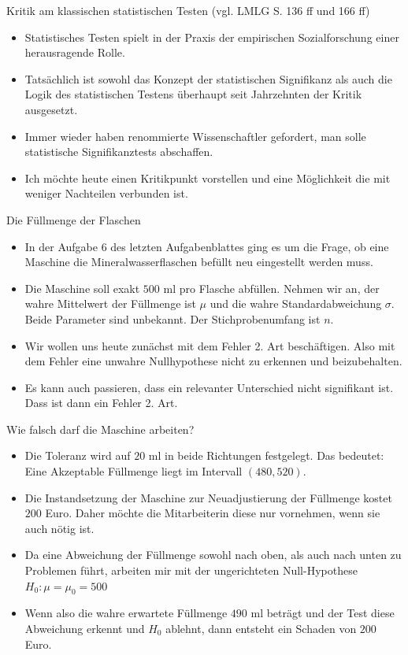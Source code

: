 \documentclass[usenames,dvipsnames,handout]{beamer}
\begin{document}
\begin{frame}{Kritik am klassischen statistischen Testen }
(vgl. LMLG S. 136 ff und 166 ff)
\begin{itemize}
\item{Statistisches Testen spielt in der Praxis der empirischen Sozialforschung einer herausragende Rolle.}\pause
\item{Tatsächlich ist sowohl das Konzept der statistischen Signifikanz als auch die Logik des statistischen
Testens überhaupt seit Jahrzehnten der Kritik ausgesetzt.}\pause
\item{Immer wieder haben renommierte Wissenschaftler gefordert, man solle statistische Signifikanztests
abschaffen. }\pause
\item{Ich möchte heute einen Kritikpunkt vorstellen und eine Möglichkeit die mit weniger Nachteilen
verbunden ist.}
\end{itemize}
\end{frame}
\begin{frame}{Die Füllmenge der Flaschen}
\begin{itemize}
\item{In der Aufgabe 6 des letzten Aufgabenblattes ging es um die Frage, ob eine Maschine die 
Mineralwasserflaschen befüllt  neu eingestellt werden muss.}\pause
\item{Die Maschine soll exakt
$500$ ml pro Flasche abfüllen. Nehmen wir an, der wahre Mittelwert der Füllmenge
ist $\mu$ und die wahre Standardabweichung $\sigma.$ Beide Parameter sind
unbekannt. Der Stichprobenumfang ist $n.$}\pause
\item{Wir wollen uns heute zunächst mit dem Fehler 2. Art beschäftigen.  Also mit dem Fehler eine unwahre 
Nullhypothese nicht zu erkennen und beizubehalten.}
\item{Es kann auch passieren, dass ein relevanter Unterschied nicht signifikant ist. Dass ist dann ein Fehler 2. Art.}
\end{itemize}
\end{frame}

\begin{frame}{Wie falsch darf die Maschine arbeiten?}
\begin{itemize}
\item{Die Toleranz wird auf $20$ ml in beide Richtungen festgelegt. Das bedeutet:
Eine Akzeptable Füllmenge liegt im Intervall $(480,520).$}\pause
\item{Die Instandsetzung der Maschine zur Neuadjustierung der Füllmenge kostet $200$ Euro.
Daher möchte die Mitarbeiterin diese nur vornehmen, wenn sie auch nötig ist.}\pause
\item{Da eine Abweichung der Füllmenge sowohl nach oben, als auch nach unten
zu Problemen führt, arbeiten mir mit der ungerichteten Null-Hypothese $H_{0}: \mu=\mu_{0}=500$}\pause
\item{Wenn also die wahre erwartete Füllmenge $490$ ml beträgt und der Test diese
Abweichung erkennt und $H_{0}$ ablehnt, dann entsteht ein Schaden von $200$ Euro.}
\end{itemize}
\end{frame}
\end{document}
